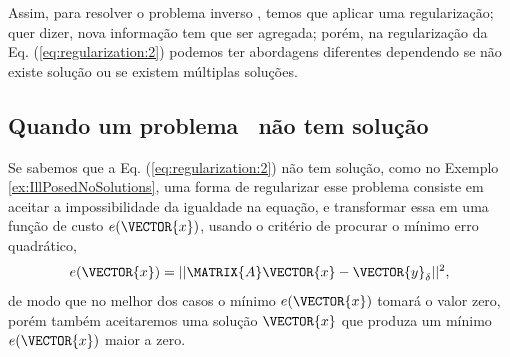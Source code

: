 Assim, para resolver o problema inverso \illposed, temos que aplicar uma regularização;
quer dizer, nova informação tem que ser agregada;
porém, na regularização da Eq. (\ref{eq:regularization:2}) podemos ter abordagens diferentes dependendo 
se não existe solução ou se existem múltiplas soluções. 
\subsection{Quando um problema \illposed~não tem solução}
Se sabemos que a Eq. (\ref{eq:regularization:2}) não tem solução, como no Exemplo \ref{ex:IllPosedNoSolutions}, 
uma forma de regularizar esse problema consiste em aceitar a impossibilidade da igualdade na equação, 
e transformar essa em uma função de custo $e(\VECTOR{x})$, usando o critério de procurar o mínimo erro quadrático,
\begin{equation}\label{eq:regularization:3}
e(\VECTOR{x})=||\MATRIX{A}\VECTOR{x}-\VECTOR{y}_{\delta}||^2,
\end{equation}
de modo que no melhor dos casos o mínimo $e(\VECTOR{x})$ tomará o valor zero, 
porém também aceitaremos uma solução $\VECTOR{x}$ que produza um mínimo $e(\VECTOR{x})$  maior a zero.
